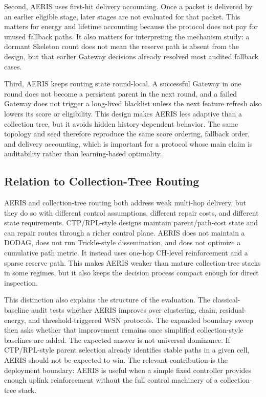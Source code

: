 \documentclass[conference]{IEEEtran}
\begin{document}
Second, AERIS uses first-hit delivery accounting. Once a packet is delivered by an earlier eligible stage, later stages are not evaluated for that packet. This matters for energy and lifetime accounting because the protocol does not pay for unused fallback paths. It also matters for interpreting the mechanism study: a dormant Skeleton count does not mean the reserve path is absent from the design, but that earlier Gateway decisions already resolved most audited fallback cases.

Third, AERIS keeps routing state round-local. A successful Gateway in one round does not become a persistent parent in the next round, and a failed Gateway does not trigger a long-lived blacklist unless the next feature refresh also lowers its score or eligibility. This design makes AERIS less adaptive than a collection tree, but it avoids hidden history-dependent behavior. The same topology and seed therefore reproduce the same score ordering, fallback order, and delivery accounting, which is important for a protocol whose main claim is auditability rather than learning-based optimality.

\subsection{Relation to Collection-Tree Routing}
AERIS and collection-tree routing both address weak multi-hop delivery, but they do so with different control assumptions, different repair costs, and different state requirements. CTP/RPL-style designs maintain parent/path-cost state and can repair routes through a richer control plane. AERIS does not maintain a DODAG, does not run Trickle-style dissemination, and does not optimize a cumulative path metric. It instead uses one-hop CH-level reinforcement and a sparse reserve path. This makes AERIS weaker than mature collection-tree stacks in some regimes, but it also keeps the decision process compact enough for direct inspection.

This distinction also explains the structure of the evaluation. The classical-baseline audit tests whether AERIS improves over clustering, chain, residual-energy, and threshold-triggered WSN protocols. The expanded boundary sweep then asks whether that improvement remains once simplified collection-style baselines are added. The expected answer is not universal dominance. If CTP/RPL-style parent selection already identifies stable paths in a given cell, AERIS should not be expected to win. The relevant contribution is the deployment boundary: AERIS is useful when a simple fixed controller provides enough uplink reinforcement without the full control machinery of a collection-tree stack.
\end{document}
